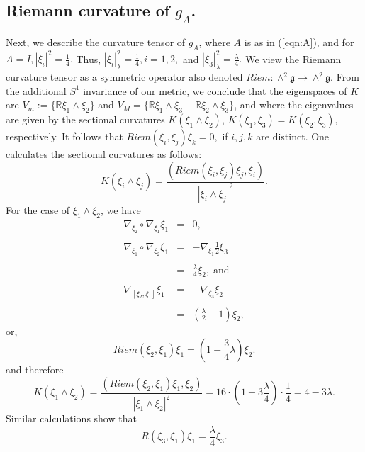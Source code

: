 \documentclass[12pt,reqno]{amsart}\usepackage{amssymb,amsmath,amscd,epsfig,amsthm,enumerate,import,eufrak}
\theoremstyle{definition}
\theoremstyle{remark}
\numberwithin{equation}{section}
\theoremstyle{plain}
\theoremstyle{definition}
\def \r {\mathbb{R}}
\def \mfg {\mathfrak{g}}
\def \vs {\vskip 2mm}
\theoremstyle{remark}
\numberwithin{theorem}{section}
\begin{document}
\subsection{Riemann curvature of $g_A$.} \label{sub:RCA} Next, we describe the curvature tensor of $g_A$, where $A$ is as in (\ref{eqn:A}), and for $A = I, |\xi_i|^2 = \frac14.$ Thus, $|\xi_i|^2_{\lambda} = \frac14, i = 1,2,$ and $|\xi_3|^2_{\lambda} = \frac{\lambda}4.$  We view the Riemann curvature tensor as a symmetric operator also denoted $Riem: \wedge^2\mathfrak{g} \to \wedge^2 \mfg$. From the additional $S^1$ invariance of our metric, we conclude that the eigenspaces of $K$ are $V_m := \{ \r \xi_1 \wedge \xi_2\}$ and $V_M = \{ \r \xi_1 \wedge \xi_3 + \r \xi_2 \wedge \xi_3\}$, and where the eigenvalues are given by the sectional curvatures $K(\xi_1\wedge\xi_2)$, $K(\xi_1, \xi_3) = K(\xi_2, \xi_3)$, respectively. It follows that $Riem(\xi_i, \xi_j) \xi_k = 0,$ if $i, j, k$ are distinct. One calculates the sectional curvatures as follows:
%
\begin{equation} \label{eqn:secK}
	K(\xi_i \wedge \xi_j) = \frac{(Riem(\xi_i, \xi_j) \xi_j, \xi_i)}{|\xi_i \wedge \xi_j|^2}.
\end{equation}
%
For the case of $\xi_1 \wedge \xi_2$, we have 
%
\[
	\begin{array}{rcl}
		\nabla_{\xi_2} \circ \nabla_{\xi_1} \xi_1 & = & 0, \\
			&	&	\\
		\nabla_{\xi_1} \circ \nabla_{\xi_2} \xi_1 & = & - \nabla_{\xi_1} \frac12 \xi_3 \\
		&	&	\\
			& = & \frac{\lambda}4 \xi_2, \; \text{and} \\
			&	&	\\
		\nabla_{[\xi_2, \xi_1]} \xi_1 & = & - \nabla_{\xi_3} \xi_2 \\
		& & \\
			& = & (\frac{\lambda}2 - 1)	 \xi_2,
	\end{array}
\]
%
or,
%
\begin{equation} \label{eqn:R12}
	Riem(\xi_2, \xi_1) \xi_1 = (1 - \frac34 \lambda) \xi_2.
\end{equation}
\vs
and therefore
%
\begin{equation} \label{eqn:K12}
	K(\xi_1 \wedge \xi_2) = \frac{(Riem(\xi_2, \xi_1) \xi_1, \xi_2)}{|\xi_1\wedge \xi_2|^2} = 16 \cdot (1- 3 \frac{\lambda}4) \cdot \frac14 = 4 - 3 \lambda.
\end{equation}
%
Similar calculations show that
%
\begin{equation}\label{eqn:K31}
	R(\xi_3, \xi_1) \xi_1 = \frac{\lambda}4 \xi_3.
\end{equation}
\end{document}
